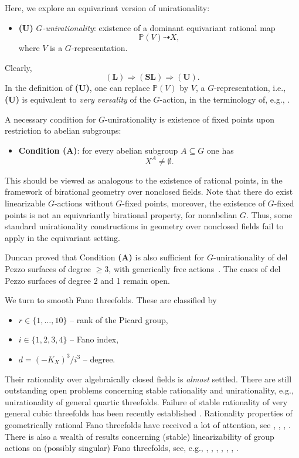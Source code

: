 \documentclass[12pt,reqno]{amsart}
\theoremstyle{plain}
\theoremstyle{remark}
\theoremstyle{definition}
\numberwithin{equation}{section}
\def\bP{{\mathbb P}}
\begin{document}
Here, we explore an equivariant version of unirationality: 
\begin{itemize}
    \item {\bf (U)} {\em $G$-unirationality}:
    existence of a dominant equivariant rational map
$$
\bP(V)\dashrightarrow X,
$$
where $V$ is a $G$-representation. 
\end{itemize}
Clearly, 
$$
\mathbf{(L)} \Rightarrow \mathbf{(SL)} \Rightarrow \mathbf{(U)}. 
$$
In the definition of {\bf (U)}, one can replace $\bP(V)$ by $V$, a $G$-representation, i.e.,  {\bf (U)} is equivalent to {\em very versality} of the $G$-action, in the terminology of, e.g., \cite{DR}. 

A necessary condition for $G$-unirationality is existence of fixed points upon restriction to abelian subgroups: 


\begin{itemize}
    \item {\bf Condition (A)}:
    for every abelian subgroup $A\subseteq G$ one has 
    $$
    X^A\neq \emptyset.
    $$
\end{itemize}


This should be viewed as analogous to the existence of rational points, in the framework of birational geometry over nonclosed fields. Note that there do exist linearizable $G$-actions without $G$-fixed points, moreover, the existence of $G$-fixed points is not an equivariantly birational property, for nonabelian $G$. Thus, some standard unirationality constructions in geometry over nonclosed fields fail to apply in the equivariant setting.   

Duncan proved that Condition {\bf (A)} is also sufficient for $G$-unirationality of del Pezzo surfaces
of degree $\ge 3$, with generically free actions~\cite[Theorem 1.4]{Duncan}. The cases of del Pezzo surfaces of degree 2 and 1 remain open. 

We turn to smooth Fano threefolds. These are classified by 
\begin{itemize}
    \item $r\in\{1,\ldots,10\}$ -- rank of the Picard group,
    \item $i\in\{1,2,3,4\}$ -- Fano index, 
    \item $d= (-K_X)^3/i^3$ -- degree. 
\end{itemize}
Their rationality over algebraically closed fields is {\em almost} settled. There are still outstanding open problems concerning stable rationality and unirationality, e.g., unirationality of general quartic threefolds. Failure of stable rationality of very general cubic threefolds has been recently established  \cite{cubicengel}. Rationality properties of geometrically rational Fano threefolds have received a lot of attention, see \cite{HT-quad}, \cite{HT-18}, \cite{KP-1}, \cite{KP-2}. There is also a wealth of results concerning (stable) linearizability of group actions on (possibly singular) Fano threefolds, see, e.g., \cite{lemire}, 
\cite{CTZ-burk}, \cite{CTZ-cubic}, \cite{CMTZ}, \cite{HT-torsor}, \cite{BBT}, \cite{TT}. 
\end{document}
